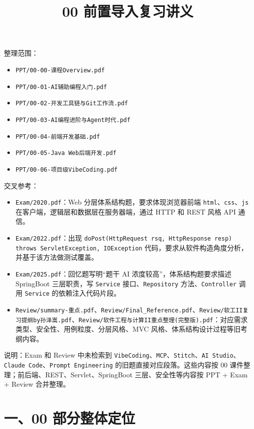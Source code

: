 \documentclass[UTF8,zihao=-4]{ctexart}
\title{00 前置导入复习讲义}
\author{}
\date{}
\begin{document}
\maketitle
\tableofcontents
\newpage


整理范围：

\begin{itemize}
\item \texttt{PPT/00-00-课程Overview.pdf}
\item \texttt{PPT/00-01-AI辅助编程入门.pdf}
\item \texttt{PPT/00-02-开发工具链与Git工作流.pdf}
\item \texttt{PPT/00-03-AI编程进阶与Agent时代.pdf}
\item \texttt{PPT/00-04-前端开发基础.pdf}
\item \texttt{PPT/00-05-Java Web后端开发.pdf}
\item \texttt{PPT/00-06-项目级VibeCoding.pdf}
\end{itemize}

交叉参考：

\begin{itemize}
\item \texttt{Exam/2020.pdf}：Web 分层体系结构题，要求体现浏览器前端 \texttt{html}、\texttt{css}、\texttt{js} 在客户端，逻辑层和数据层在服务器端，通过 HTTP 和 REST 风格 API 通信。
\item \texttt{Exam/2022.pdf}：出现 \texttt{doPost(HttpRequest rsq, HttpResponse resp) throws ServletException, IOException} 代码，要求从软件构造角度分析，并基于该方法做测试覆盖。
\item \texttt{Exam/2025.pdf}：回忆题写明“题干 AI 浓度较高”，体系结构题要求描述 SpringBoot 三层职责，写 \texttt{Service} 接口、\texttt{Repository} 方法、\texttt{Controller} 调用 \texttt{Service} 的依赖注入代码片段。
\item \texttt{Review/summary-重点.pdf}、\texttt{Review/Final\_Reference.pdf}、\texttt{Review/软工II复习提纲by孙泽嵩.pdf}、\texttt{Review/软件工程与计算II重点整理(完整版).pdf}：对应需求类型、安全性、用例粒度、分层风格、MVC 风格、体系结构设计过程等旧考纲内容。
\end{itemize}

说明：Exam 和 Review 中未检索到 \texttt{VibeCoding}、\texttt{MCP}、\texttt{Stitch}、\texttt{AI Studio}、\texttt{Claude Code}、\texttt{Prompt Engineering} 的旧题直接对应段落。这些内容按 00 课件整理；前后端、REST、Servlet、SpringBoot 三层、安全性等内容按 PPT + Exam + Review 合并整理。

\section{一、00 部分整体定位}
\end{document}
